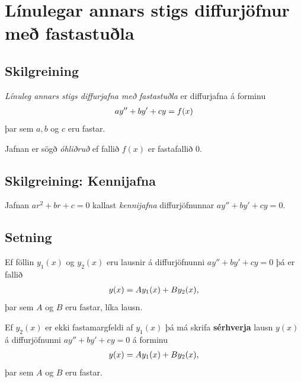 \documentclass[b5paper,10pt,icelandic]{sphinxmanual}
\begin{document}
\section{Línulegar annars stigs diffurjöfnur með fastastuðla}
\label{kafli08:linulegar-annars-stigs-diffurjofnur-me-fastastula}

\subsection{Skilgreining}
\label{kafli08:skilgreining}
\emph{Línuleg annars stigs diffurjafna með fastastuðla} er diffurjafna á
forminu
\begin{gather}
\begin{split}ay''+by'+cy=f(x)\end{split}\notag
\end{gather}
þar sem \(a, b\) og \(c\) eru fastar.

Jafnan er sögð \emph{óhliðruð} ef fallið \(f(x)\) er
fastafallið 0.


\subsection{Skilgreining: Kennijafna}
\label{kafli08:index-6}\label{kafli08:skilgreining-kennijafna}
Jafnan \(ar^2+br+c=0\) kallast \textit{kennijafna}
diffurjöfnunnar \(ay''+by'+cy=0\).


\subsection{Setning}
\label{kafli08:setning}
Ef föllin \(y_1(x)\) og \(y_2(x)\) eru lausnir á diffurjöfnunni
\(ay''+by'+cy=0\) þá er fallið
\begin{gather}
\begin{split}y(x)=Ay_1(x)+By_2(x),\end{split}\notag
\end{gather}
þar sem \(A\) og \(B\) eru fastar, líka lausn.

Ef \(y_2(x)\) er ekki fastamargfeldi af \(y_1(x)\) þá má skrifa
\textbf{sérhverja} lausn \(y(x)\) á diffurjöfnunni \(ay''+by'+cy=0\)
á forminu
\begin{gather}
\begin{split}y(x)=Ay_1(x)+By_2(x),\end{split}\notag
\end{gather}
þar sem \(A\) og \(B\) eru fastar.
\end{document}
